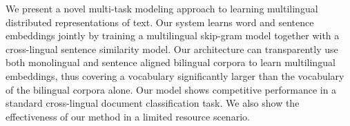 We present a novel multi-task modeling approach to learning multilingual distributed representations of text. Our system learns word and sentence embeddings jointly by training a multilingual skip-gram model together with a cross-lingual sentence similarity model. Our architecture can transparently use both monolingual and sentence aligned bilingual corpora to learn multilingual embeddings, thus covering a vocabulary significantly larger than the vocabulary of the bilingual corpora alone. Our model shows competitive performance in a standard cross-lingual document classification task. We also show the effectiveness of our method in a limited resource scenario.
